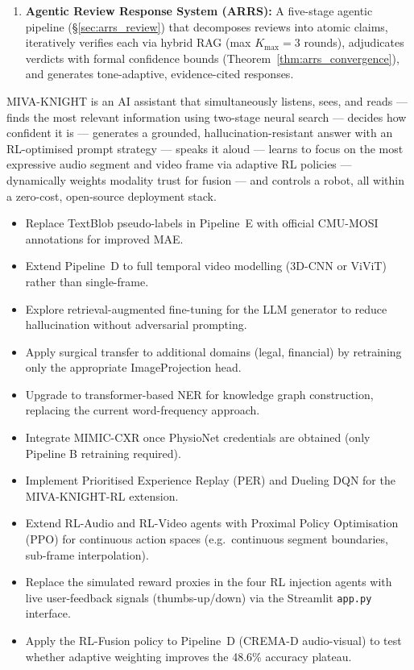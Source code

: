 \documentclass[12pt,a4paper]{article}
\theoremstyle{definition}
\theoremstyle{plain}
\theoremstyle{remark}
\begin{document}
\begin{enumerate}
  \item \textbf{Agentic Review Response System (ARRS):} A five-stage agentic pipeline 
  (\S\ref{sec:arrs_review}) that decomposes reviews into atomic claims, iteratively 
  verifies each via hybrid RAG (max $K_{\max}=3$ rounds), adjudicates verdicts with 
  formal confidence bounds (Theorem~\ref{thm:arrs_convergence}), and generates 
  tone-adaptive, evidence-cited responses.
\end{enumerate}

\begin{tcolorbox}[laymanbox,title={One-Sentence Summary}]
MIVA-KNIGHT is an AI assistant that simultaneously listens, sees, and reads --- finds the most relevant information using two-stage neural search --- decides how confident it is --- generates a grounded, hallucination-resistant answer with an RL-optimised prompt strategy --- speaks it aloud --- learns to focus on the most expressive audio segment and video frame via adaptive RL policies --- dynamically weights modality trust for fusion --- and controls a robot, all within a zero-cost, open-source deployment stack.
\end{tcolorbox}

\vfill
\begin{center}
\begin{tcolorbox}[keybox,width=0.85\textwidth,title={Future Directions}]
\begin{itemize}[nosep]
  \item Replace TextBlob pseudo-labels in Pipeline~E with official CMU-MOSI annotations for improved MAE.
  \item Extend Pipeline~D to full temporal video modelling (3D-CNN or ViViT) rather than single-frame.
  \item Explore retrieval-augmented fine-tuning for the LLM generator to reduce hallucination without adversarial prompting.
  \item Apply surgical transfer to additional domains (legal, financial) by retraining only the appropriate ImageProjection head.
  \item Upgrade to transformer-based NER for knowledge graph construction, replacing the current word-frequency approach.
  \item Integrate MIMIC-CXR once PhysioNet credentials are obtained (only Pipeline B retraining required).
  \item Implement Prioritised Experience Replay (PER) and Dueling DQN for the MIVA-KNIGHT-RL extension.
  \item Extend RL-Audio and RL-Video agents with Proximal Policy Optimisation (PPO) for continuous action spaces (e.g.\ continuous segment boundaries, sub-frame interpolation).
  \item Replace the simulated reward proxies in the four RL injection agents with live user-feedback signals (thumbs-up/down) via the Streamlit \texttt{app.py} interface.
  \item Apply the RL-Fusion policy to Pipeline~D (CREMA-D audio-visual) to test whether adaptive weighting improves the 48.6\% accuracy plateau.
\end{itemize}
\end{tcolorbox}
\end{center}
\end{document}
